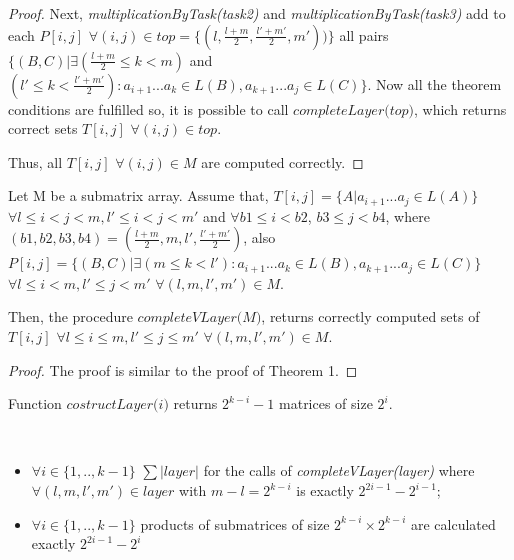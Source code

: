 \documentclass[runningheads]{llncs}
\begin{document}
\begin{proof}
Next, \textit{multiplicationByTask(task2)} and \textit{multiplicationByTask(task3)} add to each $P[i, j]$ $\forall (i, j) \in top = \{(l, \frac{l+m}{2}, \frac{l'+m'}{2}, m'))\}$ all pairs $\{(B, C) |\exists (\frac{l+m}{2} \le k < m)$ and $(l' \le k < \frac{l'+m'}{2}) : a_{i + 1}...a_{k} \in L(B), a_{k + 1}...a_{j} \in L(C)\}$. Now all the theorem conditions are fulfilled so, it is possible to call $\textit{completeLayer(top)}$, which returns correct sets $T[i, j]$ $\forall (i, j) \in top$. 

Thus, all $T[i, j]$ $\forall (i, j) \in M$ are computed correctly.
\end{proof}

\begin{theorem}
Let M be a submatrix array. Assume that, $T[i, j] =  \{ A |  a_{i + 1}...a_{j} \in L(A)\}$ $\forall l \leq i < j < m,  l' \leq i < j < m'$ and $\forall b1 \leq i < b2$,  $b3 \leq j < b4$, where $(b1, b2, b3, b4) = (\frac{l+m}{2}, m, l', \frac{l'+m'}{2})$, also $P[i, j] =  \{ (B, C) |\exists (m \le k < l'): a_{i + 1}...a_{k} \in L(B), a_{k + 1}...a_{j} \in L(C)\}$ $\forall l \leq i < m,  l' \leq j < m'$ $\forall (l, m, l', m') \in M$.

Then, the procedure $\textit{completeVLayer(M)}$, returns correctly computed sets of $T[i, j]$ $\forall l \leq i \le m,  l' \leq j \le m'$ $\forall (l, m, l', m') \in M$. 
\end{theorem}

\begin{proof}
The proof is similar to the proof of Theorem 1.
\end{proof}

\begin{note}
Function $\textit{costructLayer(i)}$ returns $2^{k - i} - 1$ matrices of size $2^i$.
\end{note}

\begin{lemma}
\
\begin{itemize}
 \item $\forall i \in \{ 1, .., k - 1\}$  $\sum{|layer|}$ for the calls of \textit{completeVLayer(layer)} where $\forall (l, m, l', m') \in layer$ with $m - l = 2^{k - i}$  is exactly $2^{2i - 1} - 2^{i - 1}$;
 \item $\forall i \in \{ 1, .., k - 1\}$ products of submatrices of size $2^{k - i} \times 2^{k - i}$ are calculated exactly $2^{2i - 1} - 2^{i}$
\end{itemize}
\end{lemma}
\end{document}
